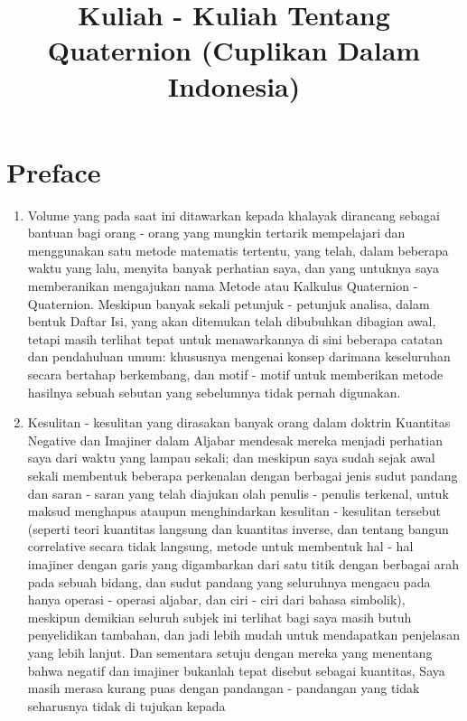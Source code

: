 \documentclass[a4paper, 12pt]{book}
\begin{document}
\title{\textbf{Kuliah - Kuliah Tentang Quaternion
(Cuplikan Dalam Indonesia)}}
\maketitle 

\chapter*{Preface}
\begin{enumerate}
\item Volume yang pada saat ini ditawarkan kepada khalayak dirancang sebagai 
bantuan bagi orang - orang yang mungkin tertarik mempelajari dan menggunakan
satu metode matematis tertentu, yang telah, dalam beberapa waktu yang lalu, 
menyita banyak perhatian saya, dan yang untuknya saya memberanikan mengajukan nama
Metode atau Kalkulus Quaternion - Quaternion. Meskipun banyak sekali petunjuk -
petunjuk analisa, dalam bentuk Daftar Isi, yang akan ditemukan telah 
dibubuhkan dibagian awal, tetapi masih terlihat tepat untuk menawarkannya di sini 
beberapa catatan dan pendahuluan umum: khususnya mengenai konsep darimana 
keseluruhan secara bertahap berkembang, dan motif - motif untuk memberikan 
metode hasilnya sebuah sebutan yang sebelumnya tidak pernah digunakan.
\item Kesulitan - kesulitan yang dirasakan banyak orang dalam doktrin Kuantitas
Negative dan Imajiner dalam Aljabar mendesak mereka menjadi perhatian saya 
dari waktu yang lampau sekali; dan meskipun saya sudah sejak awal sekali 
membentuk beberapa perkenalan dengan berbagai jenis sudut pandang dan saran 
- saran yang telah diajukan olah penulis - penulis terkenal, untuk maksud 
menghapus ataupun menghindarkan kesulitan - kesulitan tersebut (seperti teori 
kuantitas langsung dan kuantitas inverse, dan tentang bangun correlative 
secara tidak langsung, metode untuk membentuk hal - hal imajiner dengan garis 
yang digambarkan dari 
satu titik dengan berbagai arah pada sebuah bidang, dan sudut pandang yang 
seluruhnya mengacu pada hanya operasi - operasi aljabar, dan ciri - ciri dari
bahasa simbolik), meskipun demikian seluruh subjek ini terlihat bagi saya masih
butuh penyelidikan tambahan, dan jadi lebih mudah untuk mendapatkan penjelasan yang 
lebih lanjut. Dan sementara setuju dengan mereka yang menentang bahwa negatif 
dan imajiner bukanlah tepat disebut sebagai kuantitas, Saya masih merasa kurang
puas dengan pandangan - pandangan yang tidak seharusnya tidak di tujukan kepada

\end{enumerate}
\end{document}
